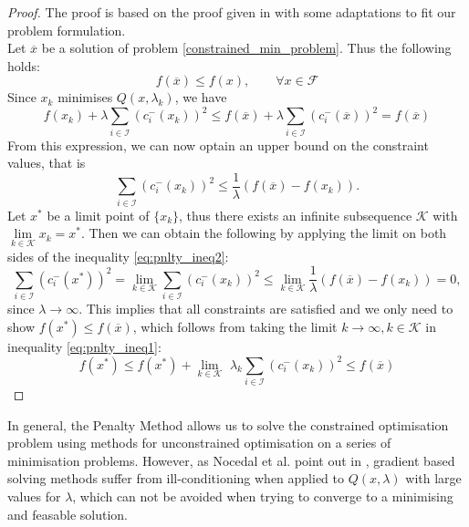 \begin{proof}
	The proof is based on the proof given in \cite{NoceWrig06} with some adaptations to fit our problem formulation.\\
	Let $\overline{x}$ be a solution of problem \ref{constrained_min_problem}. Thus the following holds: \[ f(\overline{x}) \leq f(x), \qquad \forall x \in \mathcal{F}\]
	Since $x_k$ minimises $Q(x, \lambda_k)$, we have 
	\begin{equation}
	\label{eq:pnlty_ineq1}
	f(x_k) + \lambda \sum_{i \in \mathcal{I}} (c_i^{-}(x_k))^2 \leq 
	f(\overline{x}) + \lambda \sum_{i \in \mathcal{I}} (c_i^{-}(\overline{x}))^2 =
	f(\overline{x})
	\end{equation}
	From this expression, we can now optain an upper bound on the constraint values, that is
	\begin{equation}
	\label{eq:pnlty_ineq2}
	\sum_{i \in \mathcal{I}} (c_i^{-}(x_k))^2 \leq \frac{1}{\lambda} (f(\overline{x}) - f(x_k)).
	\end{equation}
	Let $x^*$ be a limit point of $\{x_k\}$, thus there exists an infinite subsequence $\mathcal{K}$ with $\underset{k \in \mathcal{K}}{\lim} x_k = x^*$. Then we can obtain the following by applying the limit on both sides of the inequality \ref{eq:pnlty_ineq2}:
	\[ 
	\sum_{i \in \mathcal{I}} (c_i^{-}(x^*))^2 = 
	\underset{k \in \mathcal{K}}{\lim} \sum_{i \in \mathcal{I}} (c_i^{-}(x_k))^2 \leq
	\underset{k \in \mathcal{K}}{\lim} \frac{1}{\lambda} (f(\overline{x}) - f(x_k)) = 0,
	 \]
	 since $\lambda \to \infty$. This implies that all constraints are satisfied and we only need to show $f(x^*) \leq f(\overline{x})$, which follows from taking the limit $k \to \infty, k \in \mathcal{K}$ in inequality \ref{eq:pnlty_ineq1}:
	 \[ f(x^*) \leq f(x^*) +  \underset{k \in \mathcal{K}}{\lim} \,\,\lambda_k \sum_{i \in \mathcal{I}} (c_i^{-}(x_k))^2 \leq f(\overline{x})\]
\end{proof}

In general, the Penalty Method allows us to solve the constrained optimisation problem using methods for unconstrained optimisation on a series of minimisation problems. However, as Nocedal et al. point out in \cite{NoceWrig06}, gradient based solving methods suffer from ill-conditioning when applied to $Q(x, \lambda)$ with large values for $\lambda$, which can not be avoided when trying to converge to a minimising and feasable solution.

